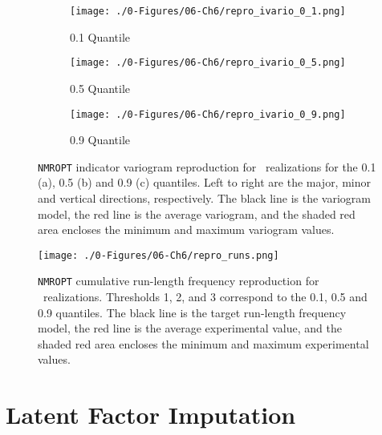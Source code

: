 \begin{figure}
    \begin{subfigure}{1.0\textwidth}
        \centering
        \texttt{[image: ./0-Figures/06-Ch6/repro\_ivario\_0\_1.png]}
        \caption{0.1 Quantile}
    \end{subfigure}
    \begin{subfigure}{1.0\textwidth}
        \centering
        \texttt{[image: ./0-Figures/06-Ch6/repro\_ivario\_0\_5.png]}
        \caption{0.5 Quantile}
    \end{subfigure}
    \begin{subfigure}{1.0\textwidth}
        \centering
        \texttt{[image: ./0-Figures/06-Ch6/repro\_ivario\_0\_9.png]}
        \caption{0.9 Quantile}
    \end{subfigure}
    \caption{\texttt{NMROPT} indicator variogram reproduction for \csnreals \ realizations for the 0.1 (a), 0.5 (b) and 0.9 (c) quantiles. Left to right are the major, minor and vertical directions, respectively. The black line is the variogram model, the red line is the average variogram, and the shaded red area encloses the minimum and maximum variogram values.}
    \label{fig:nmropt_repro_ivario}
\end{figure}

\begin{figure}[htb!]
    \centering
    \texttt{[image: ./0-Figures/06-Ch6/repro\_runs.png]}
    \caption{\texttt{NMROPT} cumulative run-length frequency reproduction for \csnreals \ realizations. Thresholds 1, 2, and 3 correspond to the 0.1, 0.5 and 0.9 quantiles. The black line is the target run-length frequency model, the red line is the average experimental value, and the shaded red area encloses the minimum and maximum experimental values.}
    \label{fig:nmropt_repro_runs}
\end{figure}


\FloatBarrier
\section{Latent Factor Imputation}
\label{sec:06fact_imp}

